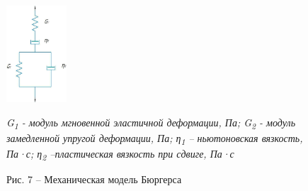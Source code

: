 \begin{figure}[H]
	\centering
	\includegraphics[width=0.2\textwidth]{assets/317}
	\caption*{\normalfont \emph{G\textsubscript{1} - модуль мгновенной эластичной деформации, Па;
	G\textsubscript{2} - модуль замедленной упругой деформации, Па;
	η\textsubscript{1} -- ньютоновская вязкость, Па·с; η\textsubscript{2}
	--пластическая вязкость при сдвиге, Па·с}}
	
	\caption*{Рис. 7 -- Механическая модель Бюргерса}
\end{figure}

